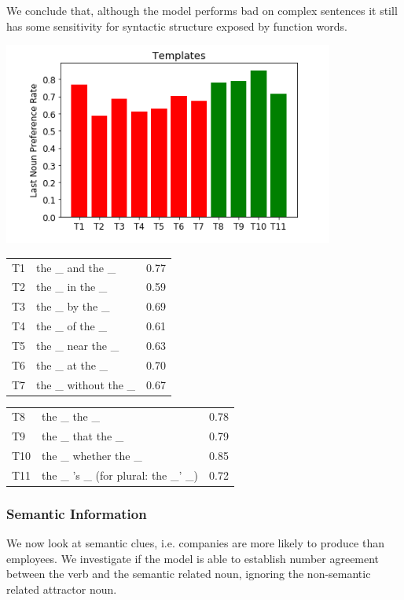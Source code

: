 \begin{multicols}{2}
We conclude that, although the model 
performs bad on complex sentences it
still has some sensitivity for syntactic 
structure exposed by function words. 


\includegraphics[scale=0.5]{screenshot-syntactic-templates} 
 
 
\begin{tabular}{ l l r }
  T1    & the \_ and the \_     &  0.77 \\
  T2    & the \_ in the \_      &  0.59 \\
  T3    & the \_ by the \_      &  0.69 \\
  T4    & the \_ of the \_      &  0.61 \\
  T5    & the \_ near the \_    &  0.63\\
  T6    & the \_ at the \_      &  0.70\\
  T7    & the \_ without the \_ & 0.67  \\
\end{tabular}

\begin{tabular}{ l l r }
  T8    & the \_ the \_         &  0.78\\
  T9    & the \_ that the \_    &  0.79\\
  T10   & the \_ whether the \_ &  0.85\\
  T11   & the \_ 's \_ (for plural: the \_' \_)          &  0.72 \\
\end{tabular}

\subsubsection{Semantic Information}

We now look at semantic clues, i.e. companies
are more likely to produce than employees.
We investigate if the model is able to establish
number agreement between the verb and the semantic related noun,
ignoring the non-semantic related attractor noun.
  

\end{multicols}

